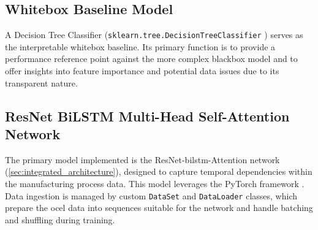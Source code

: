 \subsection{Whitebox Baseline Model}
A Decision Tree Classifier (\texttt{sklearn.tree.DecisionTreeClassifier} \autocite{Scikit-Learn}) serves as the interpretable whitebox baseline. Its primary function is to provide a performance reference point against the more complex blackbox model and to offer insights into feature importance and potential data issues due to its transparent nature.

\subsection{ResNet BiLSTM Multi-Head Self-Attention Network}
The primary model implemented is the ResNet-\gls{bilstm}-Attention network (\autoref{sec:integrated_architecture}), designed to capture temporal dependencies within the manufacturing process data. This model leverages the PyTorch framework \autocite{PyTorch}. Data ingestion is managed by custom \texttt{DataSet} and \texttt{DataLoader} classes, which prepare the \gls{ocel} data into sequences suitable for the network and handle batching and shuffling during training.

